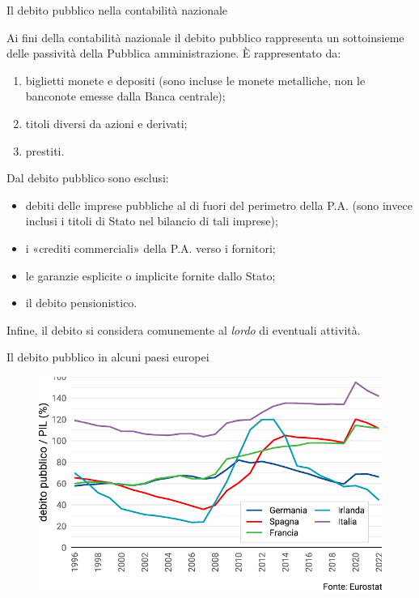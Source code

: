 \documentclass[aspectratio=149,11pt,italian]{beamer}
\begin{document}
\begin{frame}{Il debito pubblico nella contabilità nazionale}

  Ai fini della contabilità nazionale il debito pubblico rappresenta un
  sottoinsieme delle passività della Pubblica amministrazione. È rappresentato da:
  \begin{enumerate}
  \item biglietti monete e depositi (sono incluse le monete metalliche, non le
    banconote emesse dalla Banca centrale);
  \item titoli diversi da azioni e derivati;
  \item prestiti.
  \end{enumerate}
  Dal debito pubblico sono esclusi:
  \begin{itemize}
  \item debiti delle imprese pubbliche al di fuori del perimetro della
    P.A. (sono invece inclusi i titoli di Stato nel bilancio di tali imprese);
  \item i «crediti commerciali» della P.A. verso i fornitori;
  \item le garanzie esplicite o implicite fornite dallo Stato;
  \item il debito pensionistico.
\end{itemize}
Infine, il debito si considera comunemente al \emph{lordo} di eventuali
attività.
\end{frame}

\begin{frame}{Il debito pubblico in alcuni paesi europei}
  
  \begin{figure}
    \centering
    \includegraphics[width=.9\textwidth]{./figure/debito-eu-color.pdf}
  \end{figure}
\end{frame}
\end{document}
